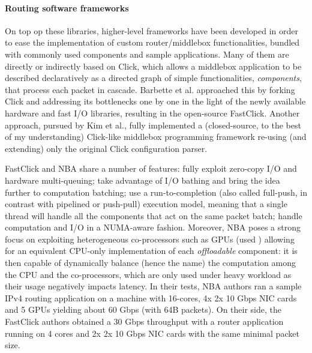 \documentclass[paper=a4, fontsize=11pt]{scrartcl}
\begin{document}
\paragraph{Routing software frameworks} On top op these libraries, higher-level frameworks have been developed in order to ease the implementation of custom router/middlebox functionalities, bundled with commonly used components and sample applications. Many of them are directly or indirectly based on Click\cite{click}, which allows a middlebox application to be described declaratively as a directed graph of simple functionalities, \emph{components}, that process each packet in cascade.
Barbette et al.\cite{fastclick} approached this by forking Click and addressing its bottlenecks one by one in the light of the newly available hardware and fast I/O libraries, resulting in the open-source FastClick. Another approach, pursued by Kim et al.\cite{nba}, fully implemented a (closed-source, to the best of my understanding) Click-like middlebox programming framework re-using (and extending) only the original Click configuration parser.

FastClick and NBA share a number of features:
fully exploit zero-copy I/O and hardware multi-queuing;
take advantage of I/O bathing and bring the idea further to computation batching;
use a run-to-completion (also called full-push, in contrast with pipelined or push-pull) execution model, meaning that a single thread will handle all the components that act on the same packet batch;
handle computation and I/O in a NUMA-aware fashion.
Moreover, NBA poses a strong focus on exploiting heterogeneous co-processors such as GPUs (used ) allowing for an equivalent CPU-only implementation of each \emph{offloadable} component: it is then capable of dynamically balance (hence the name) the computation among the CPU and the co-processors, which are only used under heavy workload as their usage negatively impacts latency. In their tests, NBA authors ran a sample IPv4 routing application on a machine with 16-cores, 4x 2x 10 Gbps NIC cards and 5 GPUs yielding about 60 Gbps (with 64B packets). On their side, the FastClick authors obtained a 30 Gbps throughput with a router application running on 4 cores and 2x 2x 10 Gbps NIC cards with the same minimal packet size. 
\end{document}
